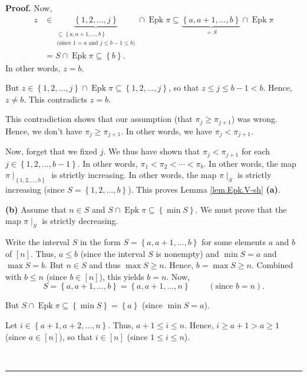 \documentclass[numbers=enddot,12pt,final,onecolumn,notitlepage]{scrartcl}%
\theoremstyle{definition}
\newenvironment{proof}[1][Proof]{\noindent\textbf{#1.} }{\ \rule{0.5em}{0.5em}}
\newenvironment{verlong}{}{}
\begin{document}
\begin{verlong}
\begin{proof}
Now,%
\begin{align*}
z  &  \in\underbrace{\left\{  1,2,\ldots,j\right\}  }_{\substack{\subseteq
\left\{  a,a+1,\ldots,b\right\}  \\\text{(since }1=a\text{ and }j\leq b-1\leq
b\text{)}}}\cap\operatorname{Epk}\pi
\subseteq
\underbrace{\left\{  a,a+1,\ldots
,b\right\}  }_{=S}\cap\operatorname{Epk}\pi\\
&  =S\cap\operatorname{Epk}\pi
\subseteq \left\{  b\right\}  .
\end{align*}
In other words, $z=b$.

But $z\in\left\{  1,2,\ldots,j\right\}  \cap\operatorname{Epk}\pi
\subseteq\left\{  1,2,\ldots,j\right\}  $, so that $z\leq j\leq b-1<b$. Hence,
$z\neq b$. This contradicts $z=b$.

This contradiction shows that our assumption (that $\pi_{j}\geq\pi_{j+1}$) was
wrong. Hence, we don't have $\pi_{j}\geq\pi_{j+1}$. In other words, we have
$\pi_{j}<\pi_{j+1}$.

Now, forget that we fixed $j$. We thus have shown that $\pi_{j}<\pi_{j+1}$ for
each $j\in\left\{  1,2,\ldots,b-1\right\}  $. In other words, $\pi_{1}<\pi
_{2}<\cdots<\pi_{b}$. In other words, the map $\pi\mid_{\left\{
1,2,\ldots,b\right\}  }$ is strictly increasing. In other words, the map
$\pi\mid_{S}$ is strictly increasing (since $S=\left\{  1,2,\ldots,b\right\}
$). This proves Lemma \ref{lem.Epk.V-sh} \textbf{(a)}.

\textbf{(b)} Assume that $n\in S$ and $S\cap\operatorname{Epk}\pi
\subseteq\left\{  \min S\right\}  $. We must prove that the map $\pi\mid_{S}$
is strictly decreasing.

Write the interval $S$ in the form $S=\left\{  a,a+1,\ldots,b\right\}  $ for
some elements $a$ and $b$ of $\left[  n\right]  $. Thus, $a\leq b$ (since the
interval $S$ is nonempty) and $\min S=a$ and $\max S=b$. But $n\in S$ and thus
$\max S\geq n$. Hence, $b=\max S\geq n$. Combined with $b\leq n$ (since
$b\in\left[  n\right]  $), this yields $b=n$. Now,%
\[
S=\left\{  a,a+1,\ldots,b\right\}  =\left\{  a,a+1,\ldots,n\right\}
\ \ \ \ \ \ \ \ \ \ \left(  \text{since }b=n\right)  .
\]


But $S\cap\operatorname{Epk}\pi\subseteq\left\{  \min S\right\}  =\left\{
a\right\}  $ (since $\min S=a$).

Let $i\in\left\{  a+1,a+2,\ldots,n\right\}  $. Thus, $a+1\leq i\leq n$. Hence,
$i\geq a+1>a\geq1$ (since $a\in\left[  n\right]  $), so that $i\in\left[
n\right]  $ (since $1\leq i\leq n$).


\end{proof}
\end{verlong}
\end{document}
